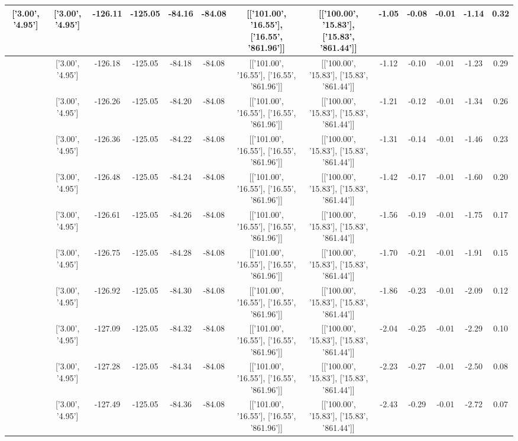 \begin{table}[htbp]
\begin{adjustbox}{angle=90}
\begin{tabular}{|c|c|c|c|c|c|c|c|c|c|c|c|c|}
 ['3.00', '4.95'] & ['3.00', '4.95'] & -126.11 & -125.05 & -84.16 & -84.08 & [['101.00', '16.55'], ['16.55', '861.96']] & [['100.00', '15.83'], ['15.83', '861.44']] & -1.05 & -0.08 & -0.01 & -1.14 & 0.32\\ \hline
 ['3.01', '4.95'] & ['3.00', '4.95'] & -126.18 & -125.05 & -84.18 & -84.08 & [['101.00', '16.55'], ['16.55', '861.96']] & [['100.00', '15.83'], ['15.83', '861.44']] & -1.12 & -0.10 & -0.01 & -1.23 & 0.29\\ \hline
 ['3.01', '4.95'] & ['3.00', '4.95'] & -126.26 & -125.05 & -84.20 & -84.08 & [['101.00', '16.55'], ['16.55', '861.96']] & [['100.00', '15.83'], ['15.83', '861.44']] & -1.21 & -0.12 & -0.01 & -1.34 & 0.26\\ \hline
 ['3.01', '4.95'] & ['3.00', '4.95'] & -126.36 & -125.05 & -84.22 & -84.08 & [['101.00', '16.55'], ['16.55', '861.96']] & [['100.00', '15.83'], ['15.83', '861.44']] & -1.31 & -0.14 & -0.01 & -1.46 & 0.23\\ \hline
 ['3.01', '4.95'] & ['3.00', '4.95'] & -126.48 & -125.05 & -84.24 & -84.08 & [['101.00', '16.55'], ['16.55', '861.96']] & [['100.00', '15.83'], ['15.83', '861.44']] & -1.42 & -0.17 & -0.01 & -1.60 & 0.20\\ \hline
 ['3.01', '4.95'] & ['3.00', '4.95'] & -126.61 & -125.05 & -84.26 & -84.08 & [['101.00', '16.55'], ['16.55', '861.96']] & [['100.00', '15.83'], ['15.83', '861.44']] & -1.56 & -0.19 & -0.01 & -1.75 & 0.17\\ \hline
 ['3.01', '4.95'] & ['3.00', '4.95'] & -126.75 & -125.05 & -84.28 & -84.08 & [['101.00', '16.55'], ['16.55', '861.96']] & [['100.00', '15.83'], ['15.83', '861.44']] & -1.70 & -0.21 & -0.01 & -1.91 & 0.15\\ \hline
 ['3.01', '4.95'] & ['3.00', '4.95'] & -126.92 & -125.05 & -84.30 & -84.08 & [['101.00', '16.55'], ['16.55', '861.96']] & [['100.00', '15.83'], ['15.83', '861.44']] & -1.86 & -0.23 & -0.01 & -2.09 & 0.12\\ \hline
 ['3.01', '4.95'] & ['3.00', '4.95'] & -127.09 & -125.05 & -84.32 & -84.08 & [['101.00', '16.55'], ['16.55', '861.96']] & [['100.00', '15.83'], ['15.83', '861.44']] & -2.04 & -0.25 & -0.01 & -2.29 & 0.10\\ \hline
 ['3.02', '4.95'] & ['3.00', '4.95'] & -127.28 & -125.05 & -84.34 & -84.08 & [['101.00', '16.55'], ['16.55', '861.96']] & [['100.00', '15.83'], ['15.83', '861.44']] & -2.23 & -0.27 & -0.01 & -2.50 & 0.08\\ \hline
 ['3.02', '4.95'] & ['3.00', '4.95'] & -127.49 & -125.05 & -84.36 & -84.08 & [['101.00', '16.55'], ['16.55', '861.96']] & [['100.00', '15.83'], ['15.83', '861.44']] & -2.43 & -0.29 & -0.01 & -2.72 & 0.07\\ \hline

\end{tabular}
\end{adjustbox}
\end{table}
